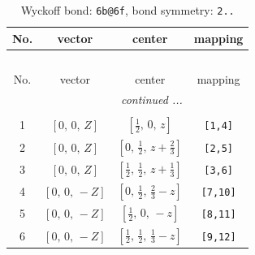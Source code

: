 \documentclass[fleqn,8pt]{jsarticle}
\begin{document}
\begin{longtable}{cccc}
\caption{Wyckoff bond: {\tt 6b@6f}, bond symmetry: {\tt 2..}}
 \\
 \hline \hline
No. & vector & center & mapping \\ \hline \endfirsthead

\multicolumn{3}{l}{\tablename\ \thetable{}} \\
 \hline \hline
No. & vector & center & mapping \\ \hline \endhead

 \hline \hline
\multicolumn{3}{r}{\footnotesize\it continued ...} \\ \endfoot

 \hline \hline
\multicolumn{3}{r}{} \\ \endlastfoot

1 & $\left[ 0,\, 0,\, Z \right]$ & $\left[ \frac{1}{2},\, 0,\, z \right]$ & {\tt [1,4]} \\ \hline
2 & $\left[ 0,\, 0,\, Z \right]$ & $\left[ 0,\, \frac{1}{2},\, z + \frac{2}{3} \right]$ & {\tt [2,5]} \\ \hline
3 & $\left[ 0,\, 0,\, Z \right]$ & $\left[ \frac{1}{2},\, \frac{1}{2},\, z + \frac{1}{3} \right]$ & {\tt [3,6]} \\ \hline
4 & $\left[ 0,\, 0,\, - Z \right]$ & $\left[ 0,\, \frac{1}{2},\, \frac{2}{3} - z \right]$ & {\tt [7,10]} \\ \hline
5 & $\left[ 0,\, 0,\, - Z \right]$ & $\left[ \frac{1}{2},\, 0,\, - z \right]$ & {\tt [8,11]} \\ \hline
6 & $\left[ 0,\, 0,\, - Z \right]$ & $\left[ \frac{1}{2},\, \frac{1}{2},\, \frac{1}{3} - z \right]$ & {\tt [9,12]} \\
\end{longtable}
\renewcommand{\arraystretch}{1.2}
\end{document}
